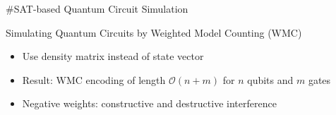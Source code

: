 \begin{refframe}{\#SAT-based Quantum Circuit Simulation}

\vspace{-3em}

\pause


\begin{block}{Simulating Quantum Circuits by Weighted Model Counting (WMC)\cite{mei2024simulating}}
\begin{itemize}
\item<+-> Use density matrix instead of state vector
\item<4-> \alert{Result: WMC encoding of length $\mathcal O(n +m)$ for $n$ qubits and $m$ gates}
\item<5-> Negative weights: \alert{constructive and destructive interference}
\end{itemize}
\end{block}


\end{refframe}
